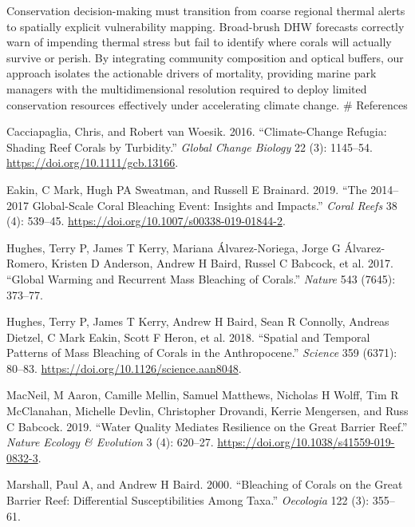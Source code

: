 \documentclass[
  letterpaper,
  DIV=11,
  numbers=noendperiod]{scrartcl}
\newlength{\cslhangindent}
\newenvironment{CSLReferences}[2] %
 {\begin{list}{}{%
  \setlength{\itemindent}{0pt}
  \setlength{\leftmargin}{0pt}
  \setlength{\parsep}{0pt}
  \ifodd #1
   \setlength{\leftmargin}{\cslhangindent}
   \setlength{\itemindent}{-1\cslhangindent}
  \fi
  \setlength{\itemsep}{#2\baselineskip}}}
 {\end{list}}
\begin{document}
Conservation decision-making must transition from coarse regional
thermal alerts to spatially explicit vulnerability mapping. Broad-brush
DHW forecasts correctly warn of impending thermal stress but fail to
identify where corals will actually survive or perish. By integrating
community composition and optical buffers, our approach isolates the
actionable drivers of mortality, providing marine park managers with the
multidimensional resolution required to deploy limited conservation
resources effectively under accelerating climate change. \# References

\label{refs}
\begin{CSLReferences}{1}{0}
Cacciapaglia, Chris, and Robert van Woesik. 2016. {``Climate-Change
Refugia: Shading Reef Corals by Turbidity.''} \emph{Global Change
Biology} 22 (3): 1145--54. \url{https://doi.org/10.1111/gcb.13166}.

Eakin, C Mark, Hugh PA Sweatman, and Russell E Brainard. 2019. {``The
2014--2017 Global-Scale Coral Bleaching Event: Insights and Impacts.''}
\emph{Coral Reefs} 38 (4): 539--45.
\url{https://doi.org/10.1007/s00338-019-01844-2}.

Hughes, Terry P, James T Kerry, Mariana Álvarez-Noriega, Jorge G
Álvarez-Romero, Kristen D Anderson, Andrew H Baird, Russel C Babcock, et
al. 2017. {``Global Warming and Recurrent Mass Bleaching of Corals.''}
\emph{Nature} 543 (7645): 373--77.

Hughes, Terry P, James T Kerry, Andrew H Baird, Sean R Connolly, Andreas
Dietzel, C Mark Eakin, Scott F Heron, et al. 2018. {``Spatial and
Temporal Patterns of Mass Bleaching of Corals in the Anthropocene.''}
\emph{Science} 359 (6371): 80--83.
\url{https://doi.org/10.1126/science.aan8048}.

MacNeil, M Aaron, Camille Mellin, Samuel Matthews, Nicholas H Wolff, Tim
R McClanahan, Michelle Devlin, Christopher Drovandi, Kerrie Mengersen,
and Russ C Babcock. 2019. {``Water Quality Mediates Resilience on the
Great Barrier Reef.''} \emph{Nature Ecology \& Evolution} 3 (4):
620--27. \url{https://doi.org/10.1038/s41559-019-0832-3}.

Marshall, Paul A, and Andrew H Baird. 2000. {``Bleaching of Corals on
the Great Barrier Reef: Differential Susceptibilities Among Taxa.''}
\emph{Oecologia} 122 (3): 355--61.


\end{CSLReferences}
\end{document}
